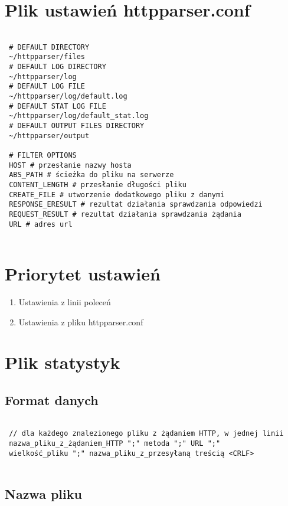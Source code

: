 \documentclass[a4paper,11pt]{report}
\begin{document}
\section{Plik ustawień httpparser.conf}

\begin{lstlisting}

 # DEFAULT DIRECTORY
 ~/httpparser/files
 # DEFAULT LOG DIRECTORY
 ~/httpparser/log
 # DEFAULT LOG FILE
 ~/httpparser/log/default.log
 # DEFAULT STAT LOG FILE
 ~/httpparser/log/default_stat.log
 # DEFAULT OUTPUT FILES DIRECTORY
 ~/httpparser/output
 
 # FILTER OPTIONS
 HOST # przesłanie nazwy hosta
 ABS_PATH # ścieżka do pliku na serwerze
 CONTENT_LENGTH # przesłanie długości pliku
 CREATE_FILE # utworzenie dodatkowego pliku z danymi
 RESPONSE_ERESULT # rezultat działania sprawdzania odpowiedzi
 REQUEST_RESULT # rezultat działania sprawdzania żądania
 URL # adres url
  
\end{lstlisting}

\section{Priorytet ustawień}

\begin{enumerate}

\item Ustawienia z linii poleceń
\item Ustawienia z pliku httpparser.conf

\end{enumerate}

\section{Plik statystyk}

\subsection{Format danych}

\begin{lstlisting}  

 // dla każdego znalezionego pliku z żądaniem HTTP, w jednej linii 
 nazwa_pliku_z_żądaniem_HTTP ";" metoda ";" URL ";" 
 wielkość_pliku ";" nazwa_pliku_z_przesyłaną treścią <CRLF>
 
\end{lstlisting}

\subsection{Nazwa pliku}
\end{document}
